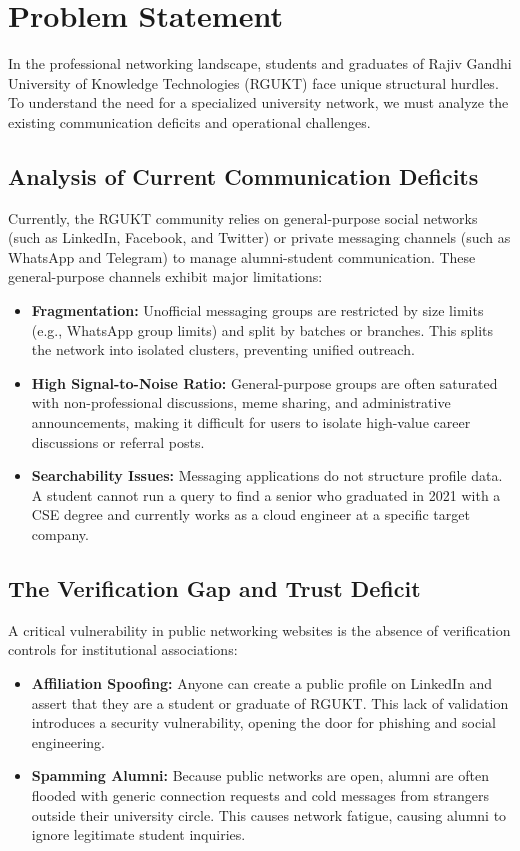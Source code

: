 \chapter{Problem Statement}
\label{ch:problem_statement}

In the professional networking landscape, students and graduates of Rajiv Gandhi University of Knowledge Technologies (RGUKT) face unique structural hurdles. To understand the need for a specialized university network, we must analyze the existing communication deficits and operational challenges.

\section{Analysis of Current Communication Deficits}
Currently, the RGUKT community relies on general-purpose social networks (such as LinkedIn, Facebook, and Twitter) or private messaging channels (such as WhatsApp and Telegram) to manage alumni-student communication. These general-purpose channels exhibit major limitations:
\begin{itemize}
    \item \textbf{Fragmentation:} Unofficial messaging groups are restricted by size limits (e.g., WhatsApp group limits) and split by batches or branches. This splits the network into isolated clusters, preventing unified outreach.
    \item \textbf{High Signal-to-Noise Ratio:} General-purpose groups are often saturated with non-professional discussions, meme sharing, and administrative announcements, making it difficult for users to isolate high-value career discussions or referral posts.
    \item \textbf{Searchability Issues:} Messaging applications do not structure profile data. A student cannot run a query to find a senior who graduated in 2021 with a CSE degree and currently works as a cloud engineer at a specific target company.
\end{itemize}

\section{The Verification Gap and Trust Deficit}
A critical vulnerability in public networking websites is the absence of verification controls for institutional associations:
\begin{itemize}
    \item \textbf{Affiliation Spoofing:} Anyone can create a public profile on LinkedIn and assert that they are a student or graduate of RGUKT. This lack of validation introduces a security vulnerability, opening the door for phishing and social engineering.
    \item \textbf{Spamming Alumni:} Because public networks are open, alumni are often flooded with generic connection requests and cold messages from strangers outside their university circle. This causes network fatigue, causing alumni to ignore legitimate student inquiries.
\end{itemize}

